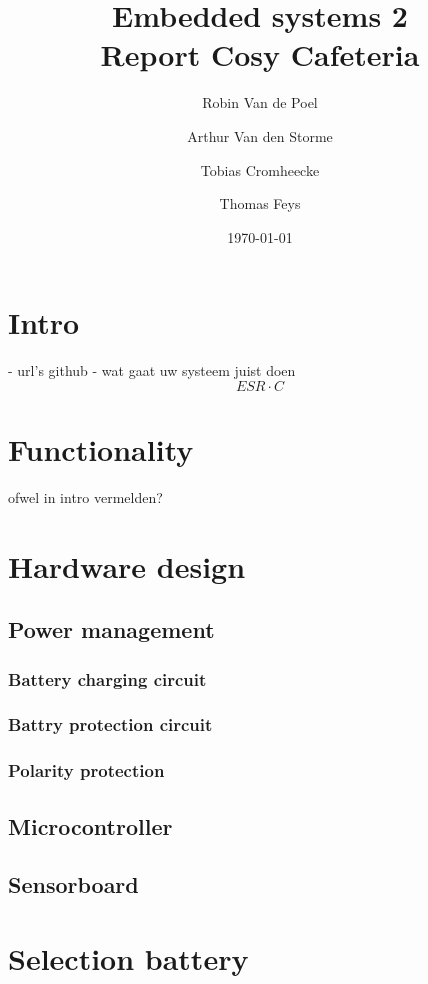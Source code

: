 \documentclass[11pt,a4paper]{article}
\begin{document}
\title{Embedded systems 2\\
	\Huge Report Cosy Cafeteria
}
\author{Robin Van de Poel\and Arthur Van den Storme\and Tobias Cromheecke\and Thomas Feys}
\date{\today}
\maketitle
\newpage

\tableofcontents
\newpage

\section{Intro}
- url's github
- wat gaat uw systeem juist doen
\[ ESR \cdot C \]
\section{Functionality}
ofwel in intro vermelden?

\section{Hardware design}
\subsection{Power management}
\subsubsection{Battery charging circuit}
\subsubsection{Battry protection circuit}
\subsubsection{Polarity protection}
\subsection{Microcontroller}
\subsection{Sensorboard}

\section{Selection battery}
\end{document}
